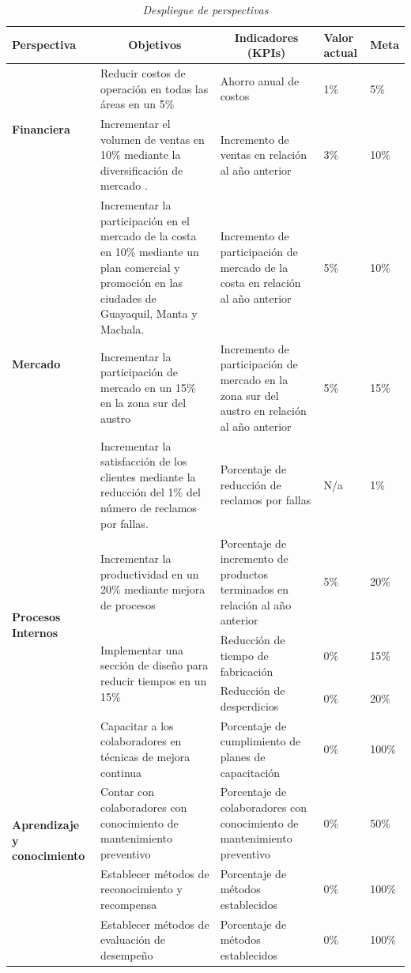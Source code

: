 \documentclass[12pt, a4paper]{article}
\begin{document}
\begin{table}[H]
\centering
\caption{\textit{{Despliegue de perspectivas}}}
\label{tabla:3}
\begin{tabular}{|p{2.5cm}|p{4.9cm}|p{4.6cm}|p{1cm}|p{1cm}|}
\hline
\textbf{Perspectiva} & \multicolumn{1}{c|}{\textbf{Objetivos}} & \multicolumn{1}{c|}{\textbf{Indicadores (KPIs)}} & \textbf{Valor actual} & \textbf{Meta} \\ \hline
\multirow{2}{2cm}{\textbf{Financiera}} & Reducir  costos de operación en todas las áreas en un 5\% & Ahorro anual de costos & 1\% & 5\% \\ \cline{2-5} 
 & Incrementar el volumen de ventas en  10\% mediante la diversificación de mercado . & Incremento de ventas en relación al año anterior & 3\% & 10\% \\ \hline
\multirow{3}{5cm}{\textbf{Mercado}} & Incrementar la participación en el mercado de la costa en  10\% mediante  un plan comercial y  promoción  en las ciudades de Guayaquil, Manta y Machala. & Incremento de participación de mercado de la costa en relación al año anterior & 5\% & 10\% \\ \cline{2-5} 
 & Incrementar la participación de mercado en un 15\% en la zona sur del austro  & Incremento de participación de mercado en la zona sur del austro en relación al año anterior & 5\% & 15\% \\ \cline{2-5} 
 & Incrementar la satisfacción de los clientes mediante la reducción del 1\% del número de reclamos por fallas. & Porcentaje de reducción de reclamos por fallas & N/a & 1\% \\ \hline
\multirow{3}{3cm}{\textbf{Procesos Internos}} & Incrementar la productividad en un 20\% mediante mejora de procesos & Porcentaje de incremento de productos terminados en relación al año anterior & 5\% & 20\% \\ \cline{2-5} 
 & \multirow{2}{4.7cm}{Implementar una sección de diseño para reducir tiempos en un 15\% } & Reducción de tiempo de fabricación & 0\% & 15\% \\ \cline{3-5} 
 &  & Reducción de desperdicios & 0\% & 20\% \\ \hline
\multirow{4}{2.2cm}{\textbf{Aprendizaje y conocimiento}} & Capacitar a los colaboradores en técnicas de mejora continua & Porcentaje de cumplimiento de planes de capacitación & 0\% & 100\% \\ \cline{2-5} 
 & Contar con colaboradores con conocimiento de mantenimiento preventivo & Porcentaje de colaboradores con conocimiento de mantenimiento preventivo & 0\% & 50\% \\ \cline{2-5} 
 & Establecer métodos de reconocimiento y recompensa  & Porcentaje de métodos establecidos & 0\% & 100\% \\ \cline{2-5} 
 & Establecer métodos de evaluación de desempeño & Porcentaje de métodos establecidos & 0\% & 100\% \\ \hline
\end{tabular}
\end{table}
\end{document}
